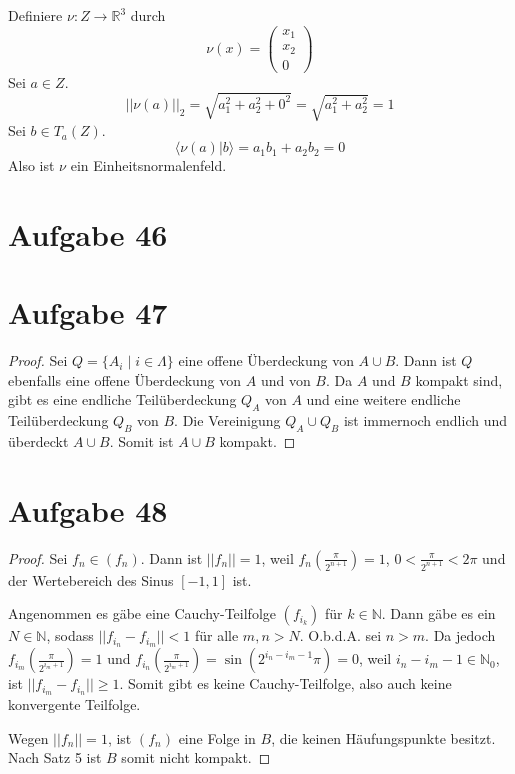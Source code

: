 \documentclass[10pt,a4paper]{article}
\begin{document}
Definiere $\nu : Z \rightarrow \mathbb{R}^{3}$ durch
\begin{equation}
  \nu(x) = \begin{pmatrix}
    x_{1}\\x_{2}\\0
  \end{pmatrix}
\end{equation}
Sei $a \in Z$.
\begin{equation}
  ||\nu(a)||_{2} = \sqrt{a_{1}^{2} + a_{2}^{2} + 0^{2}} = \sqrt{a_{1}^{2} + a_{2}^{2}} = 1
\end{equation}
Sei $b \in T_{a}(Z)$.
\begin{equation}
  \langle \nu(a) | b \rangle = a_{1}b_{1} + a_{2}b_{2} = 0
\end{equation}
Also ist $\nu$ ein Einheitsnormalenfeld.

\section{Aufgabe 46}

\section{Aufgabe 47}

\begin{proof}
  Sei $Q = \{ A_{i} \mid i \in \Lambda \}$ eine offene Überdeckung von $A \cup B$.
  Dann ist $Q$ ebenfalls eine offene Überdeckung von $A$ und von $B$.
  Da $A$ und $B$ kompakt sind, gibt es eine endliche Teilüberdeckung $Q_{A}$ von $A$ und eine weitere endliche Teilüberdeckung $Q_{B}$ von $B$.
  Die Vereinigung $Q_{A} \cup Q_{B}$ ist immernoch endlich und überdeckt $A \cup B$.
  Somit ist $A \cup B$ kompakt.
\end{proof}

\section{Aufgabe 48}

\begin{proof}
  Sei $f_{n} \in (f_{n})$.
  Dann ist $||f_{n}|| = 1$, weil $f_{n}(\frac{\pi}{2^{n + 1}}) = 1$, $0 < \frac{\pi}{2^{n + 1}} < 2\pi$ und der Wertebereich des Sinus $[-1, 1]$ ist.

  Angenommen es gäbe eine Cauchy-Teilfolge $(f_{i_{k}})$ für $k \in \mathbb{N}$.
  Dann gäbe es ein $N \in \mathbb{N}$, sodass $||f_{i_{n}} - f_{i_{m}}|| < 1$ für alle $m, n > N$.
  O.b.d.A. sei $n > m$.
  Da jedoch $f_{i_{m}}(\frac{\pi}{2^{i_{m} + 1}}) = 1$ und $f_{i_{n}}(\frac{\pi}{2^{i_{m} + 1}}) = \sin(2^{i_{n} - i_{m} - 1}\pi) = 0$, weil $i_{n} - i_{m} - 1 \in \mathbb{N}_{0}$, ist $||f_{i_{m}} - f_{i_{n}}|| \ge 1$.
  Somit gibt es keine Cauchy-Teilfolge, also auch keine konvergente Teilfolge.

  Wegen $||f_{n}|| = 1$, ist $(f_{n})$ eine Folge in $B$, die keinen Häufungspunkte besitzt.
  Nach Satz 5 ist $B$ somit nicht kompakt.
\end{proof}
\end{document}
